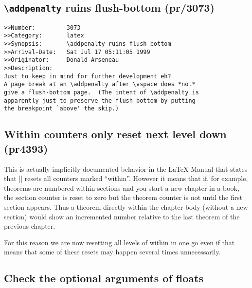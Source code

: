 \documentclass{ltxguide}
\begin{document}
\subsection{\texttt{\textbackslash addpenalty} ruins flush-bottom (pr/3073)}

\begin{verbatim}
>>Number:         3073
>>Category:       latex
>>Synopsis:       \addpenalty ruins flush-bottom
>>Arrival-Date:   Sat Jul 17 05:11:05 1999
>>Originator:     Donald Arseneau
>>Description:
Just to keep in mind for further development eh?
A page break at an \addpenalty after \vspace does *not*
give a flush-bottom page.  (The intent of \addpenalty is
apparently just to preserve the flush bottom by putting
the breakpoint `above' the skip.)
\end{verbatim}

\subsection{Within counters only reset next level down (pr4393)}

This is actually implicitly documented behavior in the \LaTeX{}
Manual that states that |\stepcounter| resets all counters marked
``within''. However it means that if, for example, theorems are
numbered within sections and you start a new chapter in a book, the
section counter is reset to zero but the theorem counter is not
until the first section appears. Thus a theorem directly within the
chapter body (without a new section) would show an incremented
number relative to the last theorem of the previous chapter.


For this reason we are now resetting all levels of within in one go
even if that means that some of these resets may happen several times
unnecessarily.


\subsection{Check the optional arguments of floats}
\end{document}
